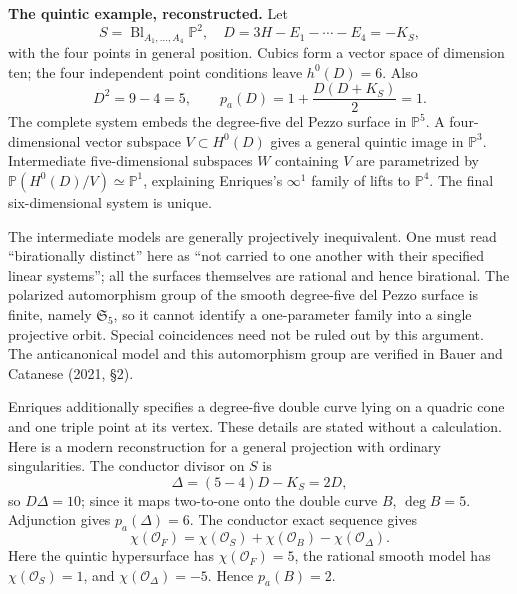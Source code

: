 \textbf{The quintic example, reconstructed.} Let \[
S=\operatorname{Bl}_{A_1,\ldots,A_4}\mathbb P^2,
\quad D=3H-E_1-\cdots-E_4=-K_S,
\] with the four points in general position. Cubics form a vector space of dimension ten; the four independent point conditions leave \(h^0(D)=6\). Also \[
D^2=9-4=5,\qquad
p_a(D)=1+\frac{D(D+K_S)}2=1.
\] The complete system embeds the degree-five del Pezzo surface in \(\mathbb P^5\). A four-dimensional vector subspace \(V\subset H^0(D)\) gives a general quintic image in \(\mathbb P^3\). Intermediate five-dimensional subspaces \(W\) containing \(V\) are parametrized by \(\mathbb P(H^0(D)/V)\simeq\mathbb P^1\), explaining Enriques's \(\infty^1\) family of lifts to \(\mathbb P^4\). The final six-dimensional system is unique.

The intermediate models are generally projectively inequivalent. One must read ``birationally distinct'' here as ``not carried to one another with their specified linear systems''; all the surfaces themselves are rational and hence birational. The polarized automorphism group of the smooth degree-five del Pezzo surface is finite, namely \(\mathfrak S_5\), so it cannot identify a one-parameter family into a single projective orbit. Special coincidences need not be ruled out by this argument. The anticanonical model and this automorphism group are verified in Bauer and Catanese (2021, §2).

Enriques additionally specifies a degree-five double curve lying on a quadric cone and one triple point at its vertex. These details are stated without a calculation. Here is a modern reconstruction for a general projection with ordinary singularities. The conductor divisor on \(S\) is \[
\Delta=(5-4)D-K_S=2D,
\] so \(D\Delta=10\); since it maps two-to-one onto the double curve \(B\), \(\deg B=5\). Adjunction gives \(p_a(\Delta)=6\). The conductor exact sequence gives \[
\chi(\mathcal O_F)=\chi(\mathcal O_S)+\chi(\mathcal O_B)
                 -\chi(\mathcal O_\Delta).
\] Here the quintic hypersurface has \(\chi(\mathcal O_F)=5\), the rational smooth model has \(\chi(\mathcal O_S)=1\), and \(\chi(\mathcal O_\Delta)=-5\). Hence \(p_a(B)=2\).

